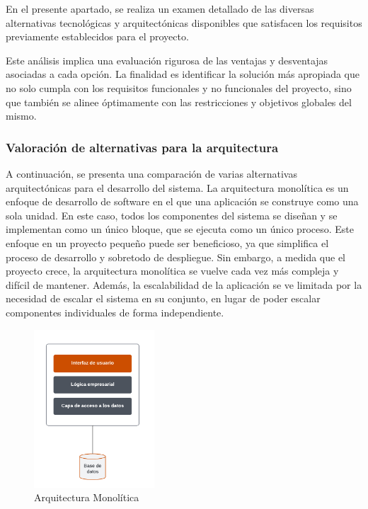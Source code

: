 
En el presente apartado, se realiza un examen detallado de las diversas alternativas tecnológicas y arquitectónicas disponibles que satisfacen los requisitos previamente establecidos para el proyecto. 

Este análisis implica una evaluación rigurosa de las ventajas y desventajas asociadas a cada opción. La finalidad es identificar la solución más apropiada que no solo cumpla con los requisitos funcionales y no funcionales del proyecto, sino que también se alinee óptimamente con las restricciones y objetivos globales del mismo.

\subsubsection{Valoración de alternativas para la arquitectura}
A continuación, se presenta una comparación de varias alternativas arquitectónicas para el desarrollo del sistema.
La arquitectura monolítica es un enfoque de desarrollo de software en el que una aplicación se construye como una sola unidad. En este caso, todos los componentes del sistema se diseñan y se implementan como un único bloque, que se ejecuta como un único proceso.
Este enfoque en un proyecto pequeño puede ser beneficioso, ya que simplifica el proceso de desarrollo y sobretodo de despliegue. Sin embargo, a medida que el proyecto crece, la arquitectura monolítica se vuelve cada vez más compleja y difícil de mantener. Además, la escalabilidad de la aplicación se ve limitada por la necesidad de escalar el sistema en su conjunto, en lugar de poder escalar componentes individuales de forma independiente.
\begin{figure}[H]
    \centering
    \includegraphics[width=0.4\textwidth]{figures/4-Estudio-viabilidad/4_Monolitica.png}
    \caption{Arquitectura Monolítica}
    \label{fig:arquitectura_monolitica}
    \hypertarget{fig:arquitectura_monolitica}{}
\end{figure}

